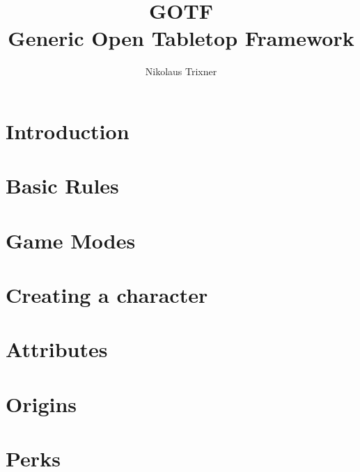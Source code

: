 \documentclass[a4paper]{book}
\begin{document}
    \title{GOTF \\ Generic Open Tabletop Framework}
    \author{Nikolaus Trixner}

    \maketitle

    \tableofcontents


    \part{Introduction}\label{part:intrudction}
    


    \part{Basic Rules}\label{part:basicRules}
    


    \part{Game Modes}\label{part:gameModes}
    
    
    
    
    

    \part{Creating a character}\label{part:characterCreation}
    

    \part{Attributes}\label{part:attributes}
    
    
    

    \part{Origins}\label{part:origins}
    
    
    

    \part{Perks}\label{part:perks}
    
    
    
    
    
    
    
\end{document}
